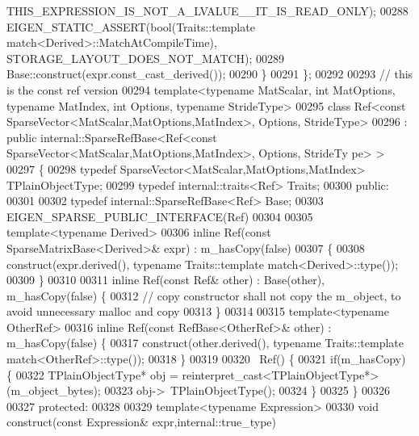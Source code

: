 \begin{DoxyCode}
      THIS\_EXPRESSION\_IS\_NOT\_A\_LVALUE\_\_IT\_IS\_READ\_ONLY);
00288       EIGEN\_STATIC\_ASSERT(\textcolor{keywordtype}{bool}(Traits::template match<Derived>::MatchAtCompileTime), 
      STORAGE\_LAYOUT\_DOES\_NOT\_MATCH);
00289       Base::construct(expr.const\_cast\_derived());
00290     \}
00291 \};
00292 
00293 \textcolor{comment}{// this is the const ref version}
00294 \textcolor{keyword}{template}<\textcolor{keyword}{typename} MatScalar, \textcolor{keywordtype}{int} MatOptions, \textcolor{keyword}{typename} MatIndex, \textcolor{keywordtype}{int} Options, \textcolor{keyword}{typename} Str\textcolor{keywordtype}{id}eType>
00295 \textcolor{keyword}{class }Ref<const SparseVector<MatScalar,MatOptions,MatIndex>, Options, StrideType>
00296   : \textcolor{keyword}{public} internal::SparseRefBase<Ref<const SparseVector<MatScalar,MatOptions,MatIndex>, Options, StrideTy
      pe> >
00297 \{
00298     \textcolor{keyword}{typedef} SparseVector<MatScalar,MatOptions,MatIndex> TPlainObjectType;
00299     \textcolor{keyword}{typedef} internal::traits<Ref> Traits;
00300   \textcolor{keyword}{public}:
00301 
00302     \textcolor{keyword}{typedef} internal::SparseRefBase<Ref> Base;
00303     EIGEN\_SPARSE\_PUBLIC\_INTERFACE(Ref)
00304 
00305     \textcolor{keyword}{template}<\textcolor{keyword}{typename} Derived>
00306     \textcolor{keyword}{inline} Ref(\textcolor{keyword}{const} SparseMatrixBase<Derived>& expr) : m\_hasCopy(false)
00307     \{
00308       construct(expr.derived(), \textcolor{keyword}{typename} Traits::template match<Derived>::type());
00309     \}
00310 
00311     \textcolor{keyword}{inline} Ref(\textcolor{keyword}{const} Ref& other) : Base(other), m\_hasCopy(false) \{
00312       \textcolor{comment}{// copy constructor shall not copy the m\_object, to avoid unnecessary malloc and copy}
00313     \}
00314 
00315     \textcolor{keyword}{template}<\textcolor{keyword}{typename} OtherRef>
00316     \textcolor{keyword}{inline} Ref(\textcolor{keyword}{const} RefBase<OtherRef>& other) : m\_hasCopy(false) \{
00317       construct(other.derived(), \textcolor{keyword}{typename} Traits::template match<OtherRef>::type());
00318     \}
00319 
00320     ~Ref() \{
00321       \textcolor{keywordflow}{if}(m\_hasCopy) \{
00322         TPlainObjectType* obj = \textcolor{keyword}{reinterpret\_cast<}TPlainObjectType*\textcolor{keyword}{>}(m\_object\_bytes);
00323         obj->~TPlainObjectType();
00324       \}
00325     \}
00326 
00327   \textcolor{keyword}{protected}:
00328 
00329     \textcolor{keyword}{template}<\textcolor{keyword}{typename} Expression>
00330     \textcolor{keywordtype}{void} construct(\textcolor{keyword}{const} Expression& expr,internal::true\_type)

\end{DoxyCode}
